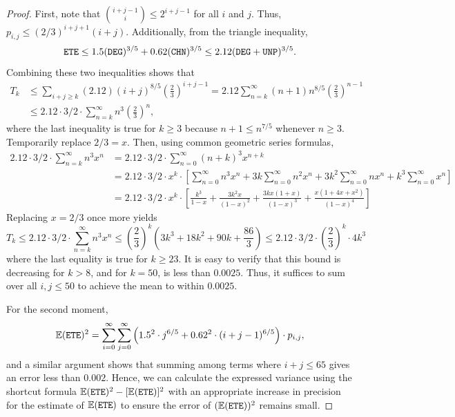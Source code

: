 \documentclass{article}
\newcommand{\DEG}{{\tt DEG}}
\newcommand{\UNP}{{\tt UNP}}
\newcommand{\ETE}{{\tt ETE}}
\newcommand{\COV}{{\tt CHN}}
\begin{document}
\begin{appendices}
\begin{proof}
    First, note that $\binom{i + j - 1}{i} \leq 2^{i + j - 1}$ for all $i$ and $j$.  Thus, $p_{i, j} \leq (2/3)^{i + j + 1}(i + j).$  Additionally, from the triangle inequality,
    \[
    \ETE \leq 1.5 (\DEG)^{3/5} + 0.62(\COV)^{3/5} \leq 2.12(\DEG + \UNP)^{3/5}.
    \]
    Combining these two inequalities shows that
    \begin{align*}
    T_k &\leq \sum_{i + j \geq k} (2.12)(i + j)^{8/5} \left(\frac{2}{3}\right)^{i + j - 1} = 2.12\sum_{n = k}^\infty (n + 1)n^{8/5}\left(\frac{2}{3}\right)^{n-1} \\
    &\leq 2.12 \cdot 3/2 \cdot\sum_{n = k}^\infty n^3 \left(\frac{2}{3}\right)^{n},
    \end{align*}
    where the last inequality is true for $k \geq 3$ because $n + 1 \leq n^{7/5}$ whenever $n \geq 3$. Temporarily replace $2/3 = x$.  Then, using common geometric series formulas,
    \begin{align*}
    2.12 \cdot 3/2 \cdot\sum_{n = k}^\infty n^3 x^{n} &= 2.12 \cdot 3/2 \cdot \sum_{n = 0}^\infty (n + k)^3 x^{n + k}\\
    &= 2.12 \cdot 3/2 \cdot x^k \cdot \left[\sum_{n = 0}^\infty n^3 x^n + 3k \sum_{n = 0}^\infty n^2 x^n + 3k^2 \sum_{n = 0}^\infty nx^n + k^3 \sum_{n = 0}^\infty x^n \right]\\
    &= 2.12 \cdot 3/2 \cdot x^k \cdot \left[ \frac{k^3}{1 - x} + \frac{3k^2x}{(1-x)^2} + \frac{3kx(1 + x)}{(1-x)^3} + \frac{x(1 + 4x + x^2)}{(1-x)^4}\right]
    \end{align*}
    Replacing $x = 2/3$ once more yields
    \[
    T_k \leq 2.12 \cdot 3/2 \cdot\sum_{n = k}^\infty n^3 x^{n} \leq \left(\frac{2}{3}\right)^k \left(3k^3 + 18k^2 + 90k + \frac{86}{3}\right) \leq 2.12 \cdot 3/2 \cdot \left(\frac{2}{3}\right)^k \cdot 4k^3
    \]
    where the last equality is true for $k \geq 23$.  It is easy to verify that this bound is decreasing for $k > 8$, and for $k = 50$, is less than $0.0025$.  Thus, it suffices to sum  over all $i, j \leq 50$ to achieve the mean to within $0.0025$.

    For the second moment,
    \[
    \mathbb{E}(\ETE)^2 = \sum_{i=0}^\infty \sum_{j=0}^\infty \left(1.5^2 \cdot j^{6/5} + 0.62^2 \cdot (i+j-1)^{6/5}\right) \cdot p_{i, j},
    \]
    and a similar argument shows that summing among terms where $i + j \leq 65$ gives an error less than $0.002$.  Hence, we can calculate the expressed variance using the shortcut formula $\mathbb{E}(\ETE)^2 - [\mathbb{E}(\ETE)]^2$ with an appropriate increase in precision for the estimate of $\mathbb{E}(\ETE)$ to ensure the error of $(\mathbb{E}(\ETE))^2$ remains small.
\end{proof}


\end{appendices}
\end{document}
